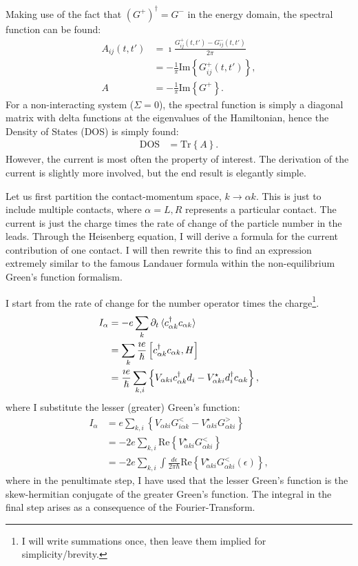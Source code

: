 Making use of the fact that $\left(G^+\right)^\dagger = G^-$ in the energy domain, the spectral function can be found:
\begin{align*}
A_{ij}(t, t') &= \imath \frac{G^+_{ij}(t, t') - G^-_{ij}(t, t')}{2\pi}\\
&= - \frac{1}{\pi} \text{Im}\left\{ G^+_{ij}(t, t')\right\}, \\
A &=- \frac{1}{\pi} \text{Im}\left\{ G^+\right\}.
\end{align*}
For a non\hyp{}interacting system ($\Sigma=0$), the spectral function is simply a diagonal matrix with delta functions at the eigenvalues of the Hamiltonian, hence the Density of States (DOS) is simply found:
\begin{align}
\text{DOS} &= \text{Tr}\left\{A\right\}.
\label{eq:dos}
\end{align}
However, the current is most often the property of interest. The derivation of the current is slightly more involved, but the end result is elegantly simple.

Let us first partition the contact-momentum space, $k \rightarrow \alpha k$. This is just to include multiple contacts, where $\alpha = L, R$ represents a particular contact.  The current is just the charge times the rate of change of the particle number in the leads. Through the Heisenberg equation, I will derive a formula for the current contribution of one contact. I will then rewrite this to find an expression extremely similar to the famous Landauer formula within the non-equilibrium Green's function formalism.

I start from the rate of change for the number operator times the charge\footnote{I will write summations once, then leave them implied for simplicity/brevity.}.  
\begin{align*}
I_\alpha &= - e \sum_{k} \partial_t \braket{c^\dagger_{\alpha k} c_{\alpha k}} \\
&= \sum_k \frac{\imath e}{\hslash} \left[ c^\dagger_{\alpha k} c_{\alpha k}, H\right] \\
&= \frac{\imath e}{\hslash}\sum_{k, i} \left\{ V_{\alpha ki} c^\dagger_{\alpha k} d_i - V^\star_{\alpha ki} d_i^\dagger c_{\alpha k}\right\},
\end{align*} where I substitute the lesser (greater) Green's function:
\begin{align*}
I_\alpha&= e \sum_{k, i}\left\{ V_{\alpha ki} G^<_{i\alpha k} - V_{\alpha ki}^\star G^>_{\alpha ki}\right\}\\
&= -2e \sum_{k, i} \text{Re}\left\{V^\star_{\alpha ki}G^<_{\alpha ki}\right\} \\
&= -2e \sum_{k, i}\int \frac{d\epsilon}{2\pi\hbar} \text{Re}\left\{ V^\star_{\alpha ki} G^<_{\alpha ki} (\epsilon) \right\},
\end{align*}
where in the penultimate step, I have used that the lesser Green's function is the skew-hermitian conjugate of the greater Green's function. The integral in the final step arises as a consequence of the Fourier-Transform.

